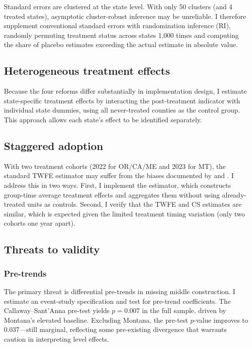 \documentclass[12pt]{article}
\begin{document}
Standard errors are clustered at the state level. With only 50 clusters (and 4 treated states), asymptotic cluster-robust inference may be unreliable. I therefore supplement conventional standard errors with randomization inference (RI), randomly permuting treatment status across states 1,000 times and computing the share of placebo estimates exceeding the actual estimate in absolute value.

\subsection{Heterogeneous treatment effects}

Because the four reforms differ substantially in implementation design, I estimate state-specific treatment effects by interacting the post-treatment indicator with individual state dummies, using all never-treated counties as the control group. This approach allows each state's effect to be identified separately.

\subsection{Staggered adoption}

With two treatment cohorts (2022 for OR/CA/ME and 2023 for MT), the standard TWFE estimator may suffer from the biases documented by \citet{goodmanbacon2021} and \citet{sunAbraham2021}. I address this in two ways. First, I implement the \citet{callawaysantanna2021} estimator, which constructs group-time average treatment effects and aggregates them without using already-treated units as controls. Second, I verify that the TWFE and CS estimates are similar, which is expected given the limited treatment timing variation (only two cohorts one year apart).

\subsection{Threats to validity}

\subsubsection*{Pre-trends} The primary threat is differential pre-trends in missing middle construction. I estimate an event-study specification and test for pre-trend coefficients. The Callaway--Sant'Anna pre-test yields $p = 0.007$ in the full sample, driven by Montana's elevated baseline. Excluding Montana, the pre-test $p$-value improves to 0.037---still marginal, reflecting some pre-existing divergence that warrants caution in interpreting level effects.
\end{document}
